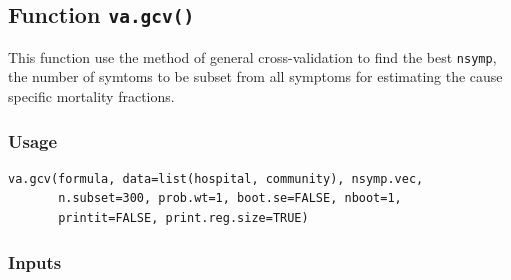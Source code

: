 \documentclass[oneside,letterpaper,titlepage]{article}
\begin{document}
\subsection{Function \texttt{va.gcv()}}
This function use the method of general cross-validation to find the best 
\texttt{nsymp}, the number of symtoms to be subset from all symptoms for 
estimating the cause specific mortality fractions. 

\subsubsection{Usage}

\begin{verbatim}
va.gcv(formula, data=list(hospital, community), nsymp.vec, 
       n.subset=300, prob.wt=1, boot.se=FALSE, nboot=1, 
       printit=FALSE, print.reg.size=TRUE)
\end{verbatim}

\subsubsection{Inputs}
\end{document}
